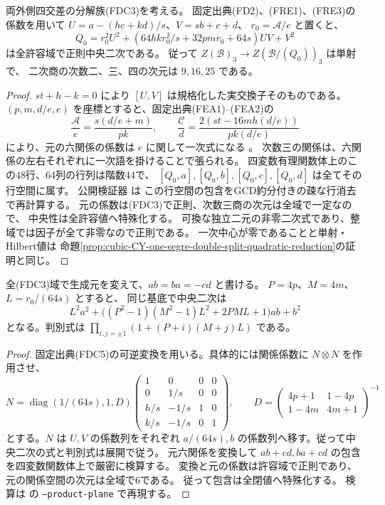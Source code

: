 \begin{proposition}\label{prop:cubic-CY-one-segre-double-split-FDC-quadratic}
両外側四交差の分解族(FDC3)を考える。
固定出典(FD2)、(FRE1)、(FRE3)の係数を用いて
$U=a-(hc+kd)/s$、$V=sb+c+d$、
$r_0=\mathcal A/e$ と置くと、
\[
 Q_0=r_0^2U^2+
       \left(64hk r_0^2/s+32pm r_0+64s\right)UV+V^2
\]
は全許容域で正則中央二次である。
従って $Z(\mathcal B)_3\to Z(\mathcal B/(Q_0))_3$ は単射で、
二次商の次数二、三、四の次元は $9,16,25$ である。
\end{proposition}
\begin{proof}
$st+h-k=0$ により $[U,V]$ は規格化した実交換子そのものである。
$(p,m,d/e,e)$ を座標とすると、固定出典(FEA1)--(FEA2)の
\[
 \frac{\mathcal A}{e}=\frac{s(d/e+m)}{pk},
 \qquad
 \frac{\mathcal C}{d}=\frac{2(st-16mh(d/e))}{pk(d/e)}
\]
により、元の六関係の係数は $e$ に関して一次式になる
\cite{AS4CYpinned}。
次数三の関係は、六関係の左右それぞれに一次語を掛けることで張られる。
四変数有理関数体上のこの48行、64列の行列は階数44で、
$[Q_0,a],[Q_0,b],[Q_0,c],[Q_0,d]$ は全てその行空間に属す。
公開検証器  は
この行空間の包含をGCD約分付きの疎な行消去で再計算する。
元の係数は(FDC3)で正則、次数三商の次元は全域で一定なので、
中央性は全許容値へ特殊化する。
可換な独立二元の非零二次式であり、整域では因子が全て非零なので正則である。
一次中心が零であることと単射・Hilbert値は
命題\ref{prop:cubic-CY-one-segre-double-split-quadratic-reduction}の証明と同じ。
\end{proof}

\begin{proposition}\label{prop:cubic-CY-one-segre-double-split-FDC-product-plane}
全(FDC3)域で生成元を変えて、$ab=ba=-cd$ と書ける。
$P=4p$、$M=4m$、$L=r_0/(64s)$ とすると、
同じ基底で中央二次は
\[
 L^2a^2+\bigl((P^2-1)(M^2-1)L^2+2PML+1\bigr)ab+b^2
\]
となる。判別式は $\prod_{i,j=\pm1}(1+(P+i)(M+j)L)$ である。
\end{proposition}
\begin{proof}
固定出典(FDC5)の可逆変換を用いる。具体的には関係係数に
$N\otimes N$ を作用させ、
\[
 N=\operatorname{diag}(1/(64s),1,D)
 \begin{pmatrix}
 1&0&0&0\\0&1/s&0&0\\h/s&-1/s&1&0\\k/s&-1/s&0&1
 \end{pmatrix},\qquad
 D=\begin{pmatrix}4p+1&1-4p\\1-4m&4m+1\end{pmatrix}^{-1}
\]
とする。$N$ は $U,V$ の係数列をそれぞれ
$a/(64s),b$ の係数列へ移す。従って中央二次の式と判別式は展開で従う。
元六関係を変換して $ab+cd,ba+cd$ の包含を四変数関数体上で厳密に検算する。
変換と元の係数は許容域で正則であり、元の関係空間の次元は全域で6である。
従って包含は全閉値へ特殊化する。
検算は 
の \texttt{--product-plane} で再現する。
\end{proof}


